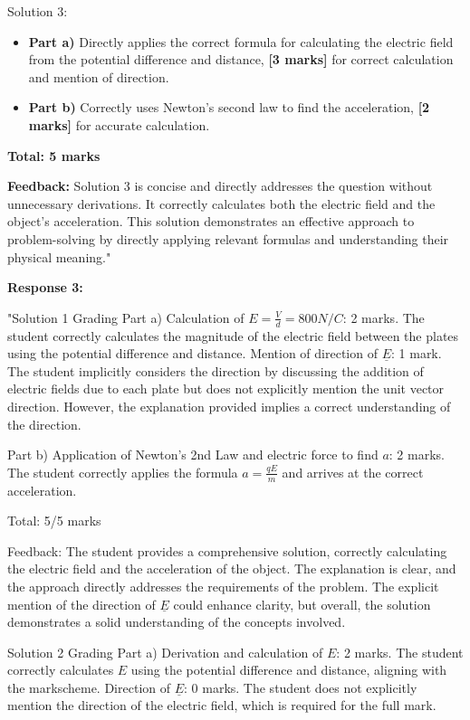 \documentclass[a4paper,11pt]{article}
\begin{document}
Solution 3:

\begin{itemize}
    \item \textbf{Part a)} Directly applies the correct formula for calculating the electric field from the potential difference and distance, \textbf{[3 marks]} for correct calculation and mention of direction.
    \item \textbf{Part b)} Correctly uses Newton's second law to find the acceleration, \textbf{[2 marks]} for accurate calculation.
\end{itemize}

\textbf{Total: 5 marks}

\textbf{Feedback:} Solution 3 is concise and directly addresses the question without unnecessary derivations. It correctly calculates both the electric field and the object's acceleration. This solution demonstrates an effective approach to problem-solving by directly applying relevant formulas and understanding their physical meaning."

\textbf{Response 3:}

"Solution 1 Grading
Part a)
Calculation of \(E = \frac{V}{d} = 800 N/C \): 2 marks. The student correctly calculates the magnitude of the electric field between the plates using the potential difference and distance.
Mention of direction of \(\underline{E}\): 1 mark. The student implicitly considers the direction by discussing the addition of electric fields due to each plate but does not explicitly mention the unit vector direction. However, the explanation provided implies a correct understanding of the direction.

Part b) 
Application of Newton's 2nd Law and electric force to find \(a\): 2 marks. The student correctly applies the formula \( a = \frac{qE}{m}\) and arrives at the correct acceleration.

Total: 5/5 marks

Feedback:
The student provides a comprehensive solution, correctly calculating the electric field and the acceleration of the object. The explanation is clear, and the approach directly addresses the requirements of the problem. The explicit mention of the direction of \(\underline{E}\) could enhance clarity, but overall, the solution demonstrates a solid understanding of the concepts involved.

Solution 2 Grading
Part a)
Derivation and calculation of \(E\): 2 marks. The student correctly calculates 
\(E\) using the potential difference and distance, aligning with the markscheme. Direction of \(\underline{E}\): 0 marks. The student does not explicitly mention the direction of the electric field, which is required for the full mark.
\end{document}
